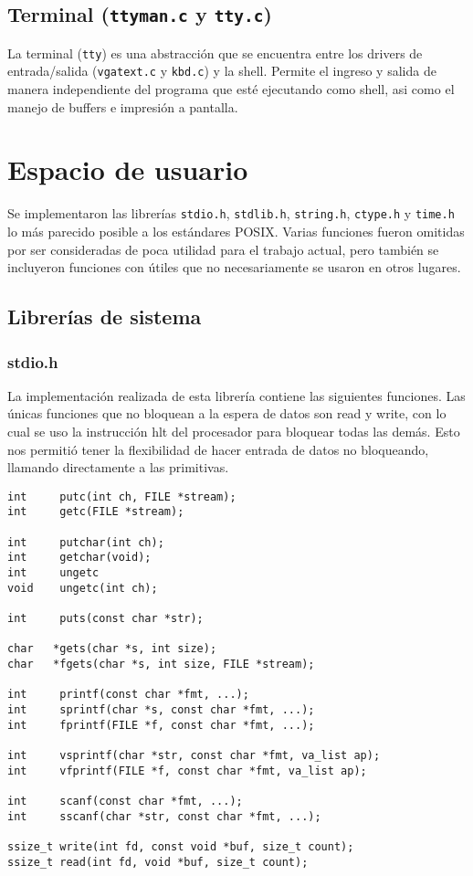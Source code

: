 \documentclass[11pt]{article}
\begin{document}
\subsection{Terminal (\texttt{ttyman.c} y \texttt{tty.c})}

La terminal (\texttt{tty}) es una abstracción que se encuentra entre los drivers de entrada/salida (\texttt{vgatext.c} y \texttt{kbd.c}) y la shell. Permite el ingreso y salida de manera independiente del programa que esté ejecutando como shell, asi como el manejo de buffers e impresión a pantalla.

\section{Espacio de usuario}

Se implementaron las librerías \texttt{stdio.h}, \texttt{stdlib.h}, \texttt{string.h}, \texttt{ctype.h} y \texttt{time.h} lo más parecido posible a los estándares POSIX. Varias funciones fueron omitidas por ser consideradas de poca utilidad para el trabajo actual, pero también se incluyeron funciones con útiles que no necesariamente se usaron en otros lugares.

\subsection{Librerías de sistema}

\subsubsection{stdio.h}
La implementación realizada de esta librería contiene las siguientes funciones. Las únicas funciones que no bloquean a la espera de datos son read y write, con lo cual se uso la instrucción hlt del procesador para bloquear todas las demás. Esto nos permitió tener la flexibilidad de hacer entrada de datos no bloqueando, llamando directamente a las primitivas.

\begin{lstlisting}
int     putc(int ch, FILE *stream);
int     getc(FILE *stream);

int     putchar(int ch);
int     getchar(void);
int     ungetc
void    ungetc(int ch);

int     puts(const char *str);

char   *gets(char *s, int size);
char   *fgets(char *s, int size, FILE *stream);

int     printf(const char *fmt, ...);
int     sprintf(char *s, const char *fmt, ...);
int     fprintf(FILE *f, const char *fmt, ...);

int     vsprintf(char *str, const char *fmt, va_list ap);
int     vfprintf(FILE *f, const char *fmt, va_list ap);

int     scanf(const char *fmt, ...);
int     sscanf(char *str, const char *fmt, ...);

ssize_t write(int fd, const void *buf, size_t count);
ssize_t read(int fd, void *buf, size_t count);
\end{lstlisting}
\end{document}
